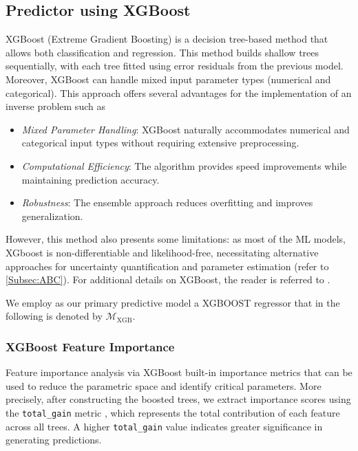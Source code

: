 \documentclass{article}
\begin{document}
		
	\subsection{Predictor  using XGBoost}\label{Subsec:XGB}
		
	XGBoost (Extreme Gradient Boosting) is a decision tree-based method \citep{hastieEnsembleLearning2009, jamesTreeBasedMethods2021} that allows both classification and regression. This method builds shallow trees sequentially, with each tree fitted using error residuals from the previous model. Moreover, XGBoost can handle mixed input parameter types (numerical and categorical). This approach offers several advantages for the implementation of an inverse problem such as 
		
	\begin{itemize}
		\item \emph{Mixed Parameter Handling}: XGBoost naturally accommodates numerical and categorical input types without requiring extensive preprocessing.
		\item \emph{Computational Efficiency}: The algorithm provides speed improvements while maintaining prediction accuracy.
		\item \emph{Robustness}: The ensemble approach reduces overfitting and improves generalization.
	\end{itemize}
		
	However, this method also presents some limitations: as most of the ML models, XGboost is non-differentiable and likelihood-free, necessitating alternative approaches for uncertainty quantification and parameter estimation (refer to \cref{Subsec:ABC}). For additional details  on XGBoost, the reader is referred to \citet{chenXGBoostScalableTree2016}.
		
	We employ as our primary predictive model a XGBOOST regressor that in the following is denoted by $\mathcal{M}_\text{XGB}$.
		
		
		
	\subsubsection{XGBoost Feature Importance}
		
	Feature importance analysis via XGBoost built-in importance metrics that can be used to reduce the parametric space and identify critical parameters. More precisely, after constructing the boosted trees, we extract importance scores using the \texttt{total\_gain} metric \citep{UGUZ20111024}, which represents the total contribution of each feature across all trees. A higher \texttt{total\_gain} value indicates greater significance in generating predictions.
		
\end{document}
